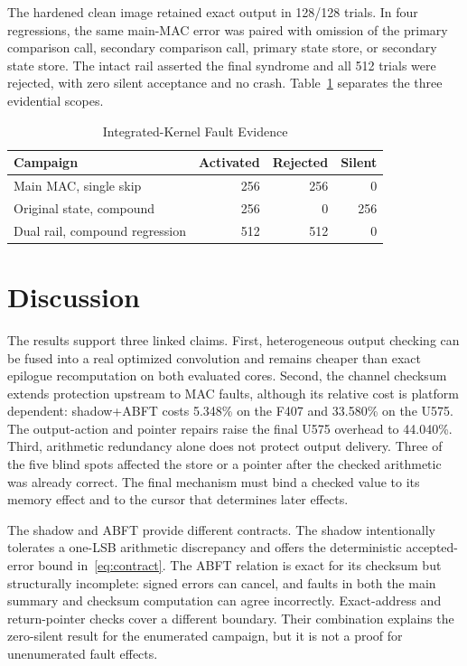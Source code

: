 \documentclass[conference]{IEEEtran}
\begin{document}
The hardened clean image retained exact output in 128/128 trials. In four regressions, the same main-MAC error was paired with omission of the primary comparison call, secondary comparison call, primary state store, or secondary state store. The intact rail asserted the final syndrome and all 512 trials were rejected, with zero silent acceptance and no crash. Table~\ref{tab:faults} separates the three evidential scopes.

\begin{table}[t]
\caption{Integrated-Kernel Fault Evidence}
\label{tab:faults}
\centering
\begin{tabular}{lrrr}
\toprule
Campaign & Activated & Rejected & Silent\\
\midrule
Main MAC, single skip & 256 & 256 & 0\\
Original state, compound & 256 & 0 & 256\\
Dual rail, compound regression & 512 & 512 & 0\\
\bottomrule
\end{tabular}
\end{table}

\section{Discussion}
The results support three linked claims. First, heterogeneous output checking can be fused into a real optimized convolution and remains cheaper than exact epilogue recomputation on both evaluated cores. Second, the channel checksum extends protection upstream to MAC faults, although its relative cost is platform dependent: shadow+ABFT costs 5.348\% on the F407 and 33.580\% on the U575. The output-action and pointer repairs raise the final U575 overhead to 44.040\%. Third, arithmetic redundancy alone does not protect output delivery. Three of the five blind spots affected the store or a pointer after the checked arithmetic was already correct. The final mechanism must bind a checked value to its memory effect and to the cursor that determines later effects.

The shadow and ABFT provide different contracts. The shadow intentionally tolerates a one-LSB arithmetic discrepancy and offers the deterministic accepted-error bound in~\eqref{eq:contract}. The ABFT relation is exact for its checksum but structurally incomplete: signed errors can cancel, and faults in both the main summary and checksum computation can agree incorrectly. Exact-address and return-pointer checks cover a different boundary. Their combination explains the zero-silent result for the enumerated campaign, but it is not a proof for unenumerated fault effects.
\end{document}
